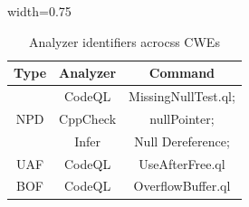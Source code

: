 \begin{table}[htb]
    \centering
    \caption{Analyzer identifiers acrocss CWEs}\label{table:command}
    \footnotesize
    \begin{adjustbox}{width=0.75\linewidth}
        \begin{tabular}{c|c|c}
        \hline
        \textbf{Type} & \textbf{Analyzer} & \textbf{Command}  \\ \hline

        \multirow{3}{*}{NPD}& CodeQL & MissingNullTest.ql; %
        \\
        & CppCheck & nullPointer;\\
        & Infer & Null Dereference; \\\hline 
        
        \multirow{1}{*}{UAF}& CodeQL &  UseAfterFree.ql
        \\\hline 

        \multirow{1}{*}{BOF}& CodeQL & OverflowBuffer.ql %
        \\\hline 

        \end{tabular}
    \end{adjustbox}
\end{table}